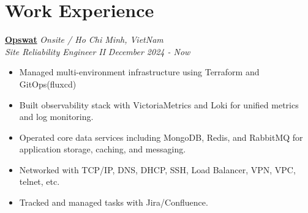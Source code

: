 \documentclass[11pt, a4paper]{article}
\begin{document}
\section{Work Experience}
\textbf{\href{https://www.opswat.com/}{Opswat}} \hfill {\small\textit{Onsite / Ho Chi Minh, VietNam}} \\
\textit{Site Reliability Engineer II} \hfill {\small\textit{December 2024 - Now}}
\begin{itemize}[leftmargin=*]
    \item Managed multi-environment infrastructure using Terraform and GitOps(fluxcd)
    \item Built observability stack with VictoriaMetrics and Loki for unified metrics and log monitoring.
    \item Operated core data services including MongoDB, Redis, and RabbitMQ for application storage, caching, and messaging.
    \item Networked with TCP/IP, DNS, DHCP, SSH, Load Balancer, VPN, VPC, telnet, etc.
    
    \item Tracked and managed tasks with Jira/Confluence.
\end{itemize}
\end{document}
